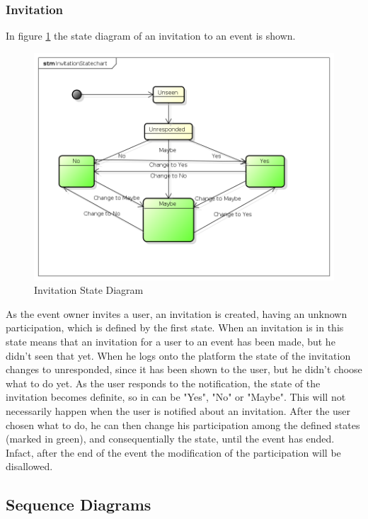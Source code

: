 \subsubsection{Invitation}\label{sssec:invitationstate} 
In figure \ref{fig:invstatediagram} the state diagram of an invitation to an event is shown.
 \begin{center}
 \begin{figure}[H]
    \includegraphics[width=1\textwidth ]{../UMLDiagram/InvitationStatechart/InvitationStatechart.png}
    \caption{Invitation State Diagram}
     \label{fig:invstatediagram}
     \end{figure}
   \end{center}
As the event owner invites a user, an invitation is created, having an unknown participation, which is defined by the first state. When an invitation is in this state means that an invitation for a user to an event has been made, but he didn't seen that yet. When he logs onto the platform the state of the invitation changes to unresponded, since it has been shown to the user, but he didn't choose what to do yet. As the user responds to the notification, the state of the invitation becomes definite, so in can be "Yes", "No" or "Maybe". This will not necessarily happen when the user is notified about an invitation. After the user chosen what to do, he can then change his participation among the defined states (marked in green), and consequentially the state, until the event has ended. Infact, after the end of the event the modification of the participation will be disallowed.
 \subsection{Sequence Diagrams}
